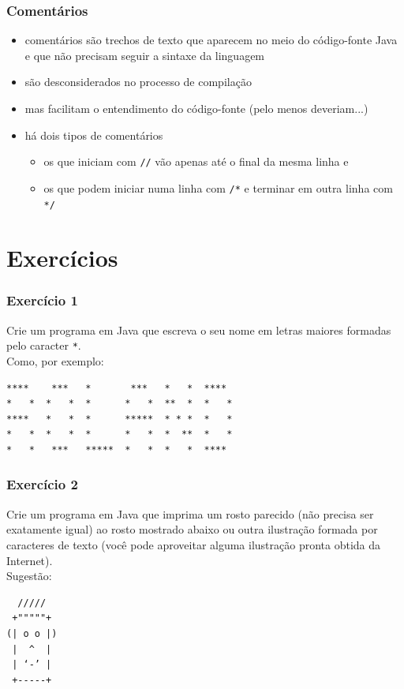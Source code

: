 \documentclass[aspectratio=169]{beamer}
\begin{document}
\begin{frame}\frametitle{Comentários}
\begin{itemize}
	\item comentários são trechos de texto que aparecem no meio do código-fonte Java e que não precisam seguir a sintaxe da linguagem
	\item são desconsiderados no processo de compilação
	\item mas facilitam o entendimento do código-fonte (pelo menos deveriam...)
	\item há dois tipos de comentários
	\begin{itemize}
		\item os que iniciam com \texttt{//} vão apenas até o final da mesma linha e
		\item os que podem iniciar numa linha com \texttt{/*} e terminar em outra linha com \texttt{*/}
	\end{itemize}
\end{itemize}
\end{frame}

\section{Exercícios}

\begin{frame}[fragile]\frametitle{Exercício 1}
Crie um programa em Java que escreva o seu nome em letras maiores formadas pelo caracter \texttt{*}.\\
Como, por exemplo:
\begin{verbatim}
****    ***   *       ***   *   *  ****
*   *  *   *  *      *   *  **  *  *   *
****   *   *  *      *****  * * *  *   *
*   *  *   *  *      *   *  *  **  *   *
*   *   ***   *****  *   *  *   *  ****
\end{verbatim}
\end{frame}

\begin{frame}[fragile]\frametitle{Exercício 2}
Crie um programa em Java que imprima um rosto parecido (não precisa ser exatamente igual) ao rosto mostrado abaixo ou outra ilustração formada por caracteres de texto (você pode aproveitar alguma ilustração pronta obtida da Internet).\\
Sugestão:
\begin{verbatim}
  /////
 +"""""+
(| o o |)
 |  ^  |
 | ‘-’ |
 +-----+
\end{verbatim}
\end{frame}
\end{document}
